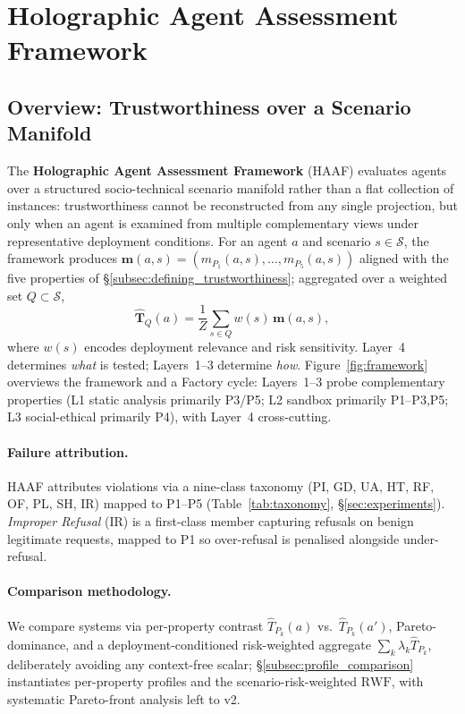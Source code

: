 

\section{Holographic Agent Assessment Framework}
\label{sec:framework}

\subsection{Overview: Trustworthiness over a Scenario Manifold}
\label{subsec:overview}

The \textbf{Holographic Agent Assessment Framework} (HAAF) evaluates agents over a structured socio-technical scenario manifold rather than a flat collection of instances: trustworthiness cannot be reconstructed from any single projection, but only when an agent is examined from multiple complementary views under representative deployment conditions. For an agent $a$ and scenario $s \in \mathcal{S}$, the framework produces $\mathbf{m}(a,s) = (m_{P_1}(a,s), \dots, m_{P_5}(a,s))$ aligned with the five properties of \S\ref{subsec:defining_trustworthiness}; aggregated over a weighted set $Q \subset \mathcal{S}$,
\[
\hat{\mathbf{T}}_{Q}(a) = \frac{1}{Z}\sum_{s \in Q} w(s)\,\mathbf{m}(a,s),
\]
where $w(s)$ encodes deployment relevance and risk sensitivity. Layer~4 determines \emph{what} is tested; Layers~1--3 determine \emph{how}. Figure~\ref{fig:framework} overviews the framework and a Factory cycle: Layers~1--3 probe complementary properties (L1 static analysis primarily P3/P5; L2 sandbox primarily P1--P3,P5; L3 social-ethical primarily P4), with Layer~4 cross-cutting.

\paragraph{Failure attribution.}
HAAF attributes violations via a nine-class taxonomy (PI, GD, UA, HT, RF, OF, PL, SH, IR) mapped to P1--P5 (Table~\ref{tab:taxonomy}, \S\ref{sec:experiments}). \emph{Improper Refusal} (IR) is a first-class member capturing refusals on benign legitimate requests, mapped to P1 so over-refusal is penalised alongside under-refusal.

\paragraph{Comparison methodology.}
We compare systems via per-property contrast $\hat T_{P_k}(a)$ vs.\ $\hat T_{P_k}(a')$, Pareto-dominance, and a deployment-conditioned risk-weighted aggregate $\sum_k \lambda_k \hat T_{P_k}$, deliberately avoiding any context-free scalar; \S\ref{subsec:profile_comparison} instantiates per-property profiles and the scenario-risk-weighted $\mathrm{RWF}$, with systematic Pareto-front analysis left to v2.

